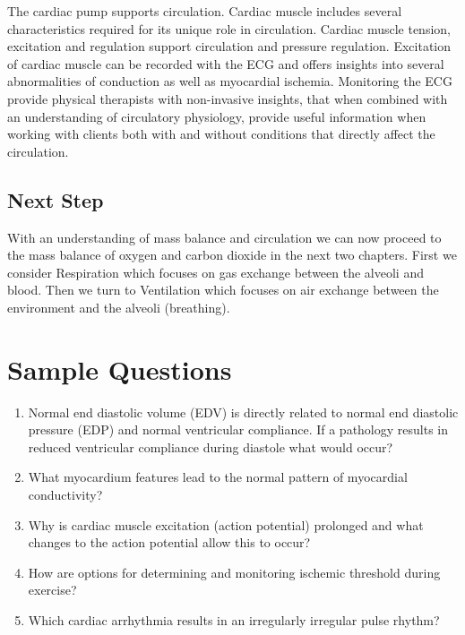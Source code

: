 The cardiac pump supports circulation. Cardiac muscle includes several characteristics required for its unique role in circulation. Cardiac muscle tension, excitation and regulation support circulation and pressure regulation. Excitation of cardiac muscle can be recorded with the ECG and offers insights into several abnormalities of conduction as well as myocardial ischemia. Monitoring the ECG provide physical therapists with non-invasive insights, that when combined with an understanding of circulatory physiology, provide useful information when working with clients both with and without conditions that directly affect the circulation.

\subsection{Next Step}

With an understanding of mass balance and circulation we can now proceed to the mass balance of oxygen and carbon dioxide in the next two chapters. First we consider Respiration which focuses on gas exchange between the alveoli and blood. Then we turn to Ventilation which focuses on air exchange between the environment and the alveoli (breathing).

\printbibliography[heading=subbibintoc]

\section*{Sample Questions}

\begin{enumerate}
    \item Normal end diastolic volume (EDV) is directly related to normal end diastolic pressure (EDP) and normal ventricular compliance. If a pathology results in reduced ventricular compliance during diastole what would occur?
    \item What myocardium features lead to the normal pattern of myocardial conductivity?
    \item Why is cardiac muscle excitation (action potential) prolonged and what changes to the action potential allow this to occur?
    \item How are options for determining and monitoring ischemic threshold during exercise? 
    \item Which cardiac arrhythmia results in an irregularly irregular pulse rhythm?
\end{enumerate} 